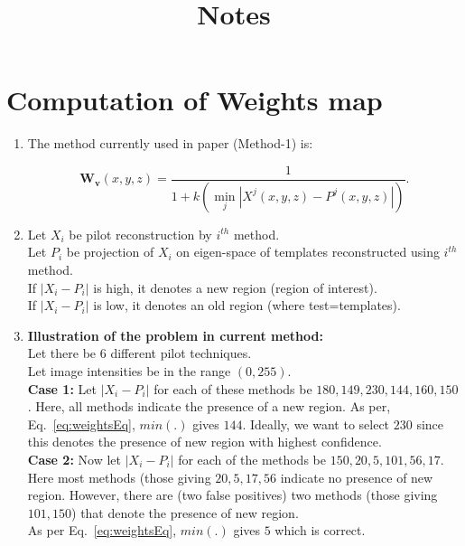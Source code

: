 \documentclass{article}
\title{Notes}
\begin{document}
\maketitle
\section{Computation of Weights map}

\begin{enumerate}
\item The method currently used in paper (Method-1) is:

\begin{equation}
  \boldsymbol{W_v}(x,y,z) = \frac{1}{1+k(\min_{j}|X^j(x,y,z) - P^j(x,y,z)|)}.
  \label{eq:weightsEq}
\end{equation}

\item 
  Let $X_i$ be pilot reconstruction by $i^{th}$ method.\\
  Let $P_i$ be projection of $X_i$ on eigen-space of templates reconstructed using $i^{th}$ method.\\
  If $|X_i-P_i|$ is high, it denotes a new region (region of interest).\\
  If $|X_i-P_i|$ is low, it denotes an old region (where test=templates).
\item \textbf{Illustration of the problem in current method:}\\
  Let there be $6$ different pilot techniques.\\
  Let image intensities be in the range $(0,255)$.\\
  \textbf{Case 1:} Let $|X_i-P_i|$ for each of these methods be $180, 149, 230, 144, 160, 150$. Here, all methods indicate the presence of a new region.
  As per, Eq.~\ref{eq:weightsEq}, $min(.)$ gives $144$. Ideally, we want to select $230$ since this denotes the presence of new region with highest confidence.\\
  \textbf{Case 2: }Now let $|X_i-P_i|$ for each of the methods be $150, 20, 5, 101, 56, 17$. Here most methods (those giving $20, 5, 17, 56$ indicate no presence of new region. However, there are (two false positives) two methods (those giving $101, 150$) that denote the presence of new region.\\
  As per Eq.~\ref{eq:weightsEq}, $min(.)$ gives $5$ which is correct.\\


\end{enumerate}
\end{document}
